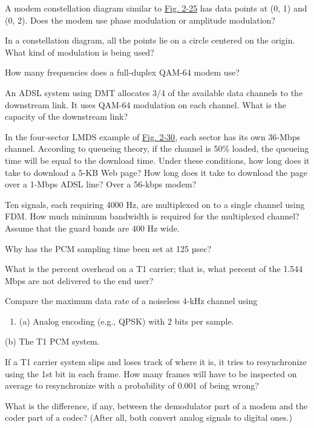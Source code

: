 A modem constellation diagram similar to
\protect\hyperlink{0130661023_ch02lev1sec5.htmlux5cux23ch02fig25}{Fig.
2-25} has data points at (0, 1) and (0, 2). Does the modem use phase
modulation or amplitude modulation?

In a constellation diagram, all the points lie on a circle centered on
the origin. What kind of modulation is being used?

How many frequencies does a full-duplex QAM-64 modem use?

An ADSL system using DMT allocates 3/4 of the available data channels to
the downstream link. It uses QAM-64 modulation on each channel. What is
the capacity of the downstream link?

In the four-sector LMDS example of
\protect\hyperlink{0130661023_ch02lev1sec5.htmlux5cux23ch02fig30}{Fig.
2-30}, each sector has its own 36-Mbps channel. According to queueing
theory, if the channel is 50\% loaded, the queueing time will be equal
to the download time. Under these conditions, how long does it take to
download a 5-KB Web page? How long does it take to download the page
over a 1-Mbps ADSL line? Over a 56-kbps modem?

Ten signals, each requiring 4000 Hz, are multiplexed on to a single
channel using FDM. How much minimum bandwidth is required for the
multiplexed channel? Assume that the guard bands are 400 Hz wide.

Why has the PCM sampling time been set at 125 µsec?

What is the percent overhead on a T1 carrier; that is, what percent of
the 1.544 Mbps are not delivered to the end user?

Compare the maximum data rate of a noiseless 4-kHz channel using

\begin{enumerate}
\def\labelenumi{\alph{enumi}.}
\item
  {}

  (a) Analog encoding (e.g., QPSK) with 2 bits per sample.
\end{enumerate}

(b) The T1 PCM system.

If a T1 carrier system slips and loses track of where it is, it tries to
resynchronize using the 1st bit in each frame. How many frames will have
to be inspected on average to resynchronize with a probability of 0.001
of being wrong?

What is the difference, if any, between the demodulator part of a modem
and the coder part of a codec? (After all, both convert analog signals
to digital ones.)

